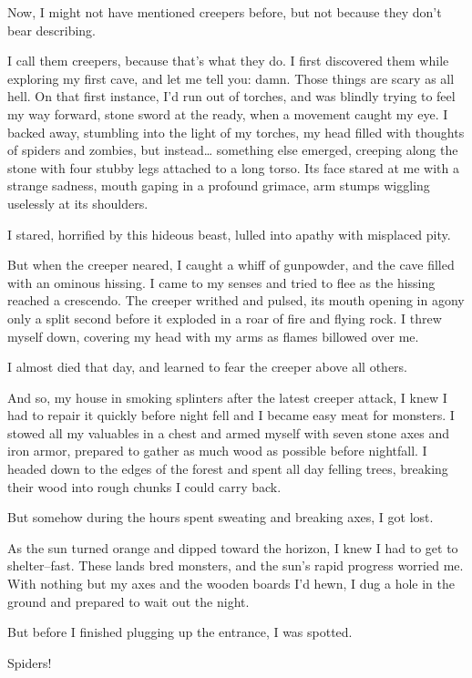 \documentclass[
]{book}
\begin{document}
Now, I might not have mentioned creepers before, but not because they don't bear describing.

I call them creepers, because that's what they do. I first discovered them while exploring my first cave, and let me tell you: damn. Those things are scary as all hell. On that first instance, I'd run out of torches, and was blindly trying to feel my way forward, stone sword at the ready, when a movement caught my eye. I backed away, stumbling into the light of my torches, my head filled with thoughts of spiders and zombies, but instead\ldots{} something else emerged, creeping along the stone with four stubby legs attached to a long torso. Its face stared at me with a strange sadness, mouth gaping in a profound grimace, arm stumps wiggling uselessly at its shoulders.

I stared, horrified by this hideous beast, lulled into apathy with misplaced pity.

But when the creeper neared, I caught a whiff of gunpowder, and the cave filled with an ominous hissing. I came to my senses and tried to flee as the hissing reached a crescendo. The creeper writhed and pulsed, its mouth opening in agony only a split second before it exploded in a roar of fire and flying rock. I threw myself down, covering my head with my arms as flames billowed over me.

I almost died that day, and learned to fear the creeper above all others.

And so, my house in smoking splinters after the latest creeper attack, I knew I had to repair it quickly before night fell and I became easy meat for monsters. I stowed all my valuables in a chest and armed myself with seven stone axes and iron armor, prepared to gather as much wood as possible before nightfall. I headed down to the edges of the forest and spent all day felling trees, breaking their wood into rough chunks I could carry back.

But somehow during the hours spent sweating and breaking axes, I got lost.

As the sun turned orange and dipped toward the horizon, I knew I had to get to shelter--fast. These lands bred monsters, and the sun's rapid progress worried me. With nothing but my axes and the wooden boards I'd hewn, I dug a hole in the ground and prepared to wait out the night.

But before I finished plugging up the entrance, I was spotted.

Spiders!
\end{document}
